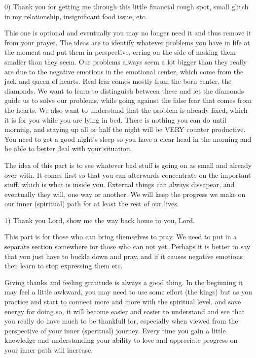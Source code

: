 \documentclass[12pt,letterpaper]{book}
\begin{document}
0) Thank you for getting me through this little financial rough spot, small glitch in my relationship, insignificant food issue, etc.

This one is optional and eventually you may no longer need it and thus remove it from your prayer. The ideas are to identify whatever problems you have in life at the moment and put them in perspective, erring on the side of making them smaller than they seem. Our problems always seem a lot bigger than they really are due to the negative emotions in the emotional center, which come from the jack and queen of hearts. Real fear comes mostly from the born center, the diamonds. We want to learn to distinguish between these and let the diamonds guide us to solve our problems, while going against the false fear that comes from the hearts. We also want to understand that the problem is already fixed, which it is for you while you are lying in bed. There is nothing you can do until morning, and staying up all or half the night will be VERY counter productive. You need to get a good night's sleep so you have a clear head in the morning and be able to better deal with your situation. 

The idea of this part is to see whatever bad stuff is going on as small and already over with. It comes first so that you can afterwards concentrate on the important stuff, which is what is inside you. External things can always dissapear, and eventually they will, one way or another.  We will keep the progress we make on our inner (spiritual) path for at least the rest of our lives. 

1) Thank you Lord, show me the way back home to you, Lord.

This part is for those who can bring themselves to pray. We need to put in a separate section somewhere for those who can not yet. Perhaps it is better to say that you just have to buckle down and pray, and if it causes negative emotions then learn to stop expressing them etc.

Giving thanks and feeling gratitude is always a good thing. In the beginning it may feel a little awkward, you may need to use some effort (the kings) but as you practice and start to connect more and more with the spiritual level, and save energy for doing so, it will become easier and easier to understand and see that you really do have much to be thankfull for, especially when viewed from the perspective of your inner (speritual) journey. Every time you gain a little knowledge and understanding your ability to love and appreciate progress on your inner path will increase.
\end{document}

